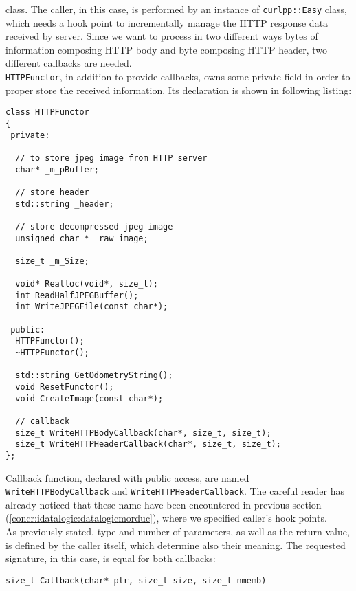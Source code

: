 class. The caller, in this case, is performed by an instance of
\texttt{curlpp::Easy} class, which needs a hook point to incrementally
manage the HTTP response data received by server. Since we want to
process in two different ways bytes of information composing HTTP body
and byte composing HTTP header, two different callbacks are needed.
\\
\texttt{HTTPFunctor}, in addition to provide callbacks, owns some
private field in order to proper store the received information. Its
declaration is shown in following listing:
\\
\begin{lstlisting}[caption={\texttt{HTTPFunctor} declaration},
    label={code:datalogiclogsimulator:httpfunctor:declaration}]
class HTTPFunctor
{
 private:

  // to store jpeg image from HTTP server
  char* _m_pBuffer;

  // store header
  std::string _header;

  // store decompressed jpeg image
  unsigned char * _raw_image;

  size_t _m_Size;

  void* Realloc(void*, size_t);
  int ReadHalfJPEGBuffer();
  int WriteJPEGFile(const char*);

 public:
  HTTPFunctor();
  ~HTTPFunctor();

  std::string GetOdometryString();
  void ResetFunctor();
  void CreateImage(const char*);

  // callback
  size_t WriteHTTPBodyCallback(char*, size_t, size_t);
  size_t WriteHTTPHeaderCallback(char*, size_t, size_t);
};
\end{lstlisting}

Callback function, declared with public access, are named
\texttt{WriteHTTPBodyCallback} and \texttt{WriteHTTPHeaderCallback}.
The
careful reader has already noticed that these name have been
encountered in previous section
(\ref{concr:idatalogic:datalogicmorduc}), where we specified
caller's hook points.
\\
As previously stated, type and number of parameters, as well
as the return value, is defined by the caller itself, which
determine also their meaning. The requested signature, in this
case, is equal for both callbacks:

\begin{center}
  \texttt{size\_t Callback(char* ptr, size\_t size, size\_t nmemb)}
\end{center}

